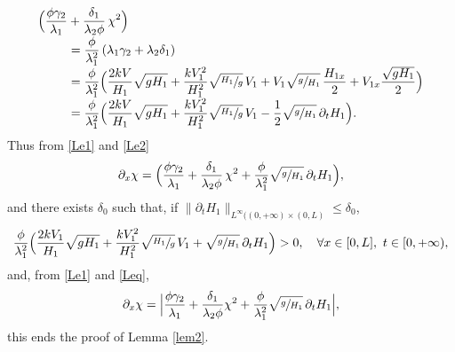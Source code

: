 \begin{equation}
\begin{split}
\Bigl(\frac{\phi\gamma_{2}}{\lambda_{1}}&+\frac{\delta_{1}}{\lambda_{2}\phi}\,\chi^{2}\Bigr)\\[-3pt]
&=\frac{\phi}{\lambda_{1}^{2}}\left(\lambda_{1}\gamma_{2}+\lambda_{2}\delta_{1}\right)\\[-3pt]
&=\frac{\phi}{\lambda_{1}^{2}} \Bigl(\frac{2kV}{H_{1}}\sqrt{gH_{1}}+\frac{kV_{1}^{2}}{H_{1}^{2}}\sqrt{\sfrac{H_{1}}{g}}\,V_{1}+V_{1}\sqrt{\sfrac{g}{H_{1}}}\,\frac{H_{1x}}{2}+V_{1x}\frac{\sqrt{gH_{1}}}{2} \Bigr)\\[-3pt]
&=\frac{\phi}{\lambda_{1}^{2}} \Bigl(\frac{2kV}{H_{1}}\sqrt{gH_{1}}+\frac{kV_{1}^{2}}{H_{1}^{2}}\sqrt{\sfrac{H_{1}}{g}}\,V_{1}-\frac{1}{2}\sqrt{\sfrac{g}{H_{1}}}\,\partial_{t}H_{1} \Bigr).
\end{split}
\label{Le2}
\end{equation}
Thus from \eqref{Le1} and \eqref{Le2}
\begin{equation}
\partial_{x}\chi= \Bigl(\frac{\phi\gamma_{2}}{\lambda_{1}}+\frac{\delta_{1}}{\lambda_{2}\phi}\,\chi^{2}+{\frac{\phi}{\lambda_{1}^{2}}}\sqrt{\sfrac{g}{H_{1}}}\,\partial_{t}H_{1} \Bigr),
\label{Leq}
\end{equation}
{and} there exists $\delta_{0}$ such that, if $\lVert \partial_{t}H_{1}\rVert_{L^{\infty}((0,+\infty)\times(0,L)}\leq \delta_{0}$,
\begin{equation*}
\frac{\phi}{\lambda_{1}^{2}} \Bigl(\frac{2kV_{1}}{H_{1}}\sqrt{gH_{1}}+\frac{kV_{1}^{2}}{H_{1}^{2}}\sqrt{\sfrac{H_{1}}{g}}\,V_{1}+\sqrt{\sfrac{g}{H_{1}}}\,\partial_{t}H_{1} \Bigr)>0,\quad\forall x\in[0,L],\ t\in[0,+\infty),
\end{equation*}
and, from \eqref{Le1} and \eqref{Leq},
\begin{equation*}
\partial_{x}\chi= \Bigl |\frac{\phi\gamma_{2}}{\lambda_{1}}+\frac{\delta_{1}}{\lambda_{2}\phi}\chi^{2}+{\frac{\phi}{\lambda_{1}^{2}}}\sqrt{\sfrac{g}{H_{1}}}\,\partial_{t}H_{1} \Bigr|,
\end{equation*}
this ends the proof of Lemma \ref{lem2}.

